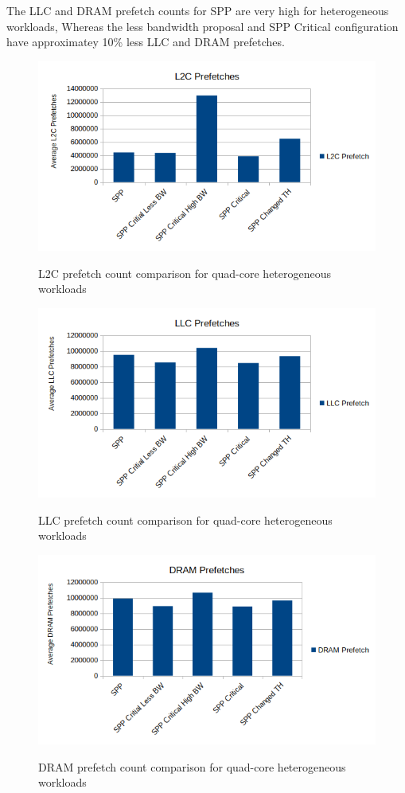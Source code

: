 The LLC and DRAM prefetch counts for SPP are very high for heterogeneous workloads, Whereas the less bandwidth proposal and SPP Critical configuration have approximatey 10\% less LLC and DRAM prefetches. 
\begin{figure}[H]
{\includegraphics[scale=0.7]{images/L2C_Hetro.png}}
\caption{L2C prefetch count comparison for quad-core heterogeneous workloads}
\label{fig:hetero-l2cpref}
\end{figure}
\begin{figure}[H]
{\includegraphics[scale=0.7]{images/LLC_Hetro.png}}
\caption{LLC prefetch count comparison for quad-core heterogeneous workloads}
\label{fig:hetero-llcpref}
\end{figure}
\begin{figure}[H]
{\includegraphics[scale=0.7]{images/DRAM BW Hetro.png}}
\caption{DRAM prefetch count comparison for quad-core heterogeneous workloads}
\label{fig:hetero-drampref}
\end{figure}
